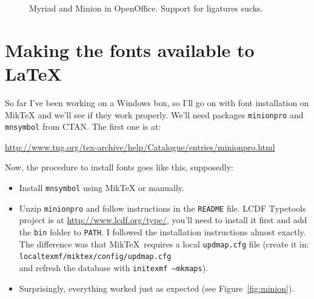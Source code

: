 \documentclass[10pt]{article}
\begin{document}
\begin{figure}[p]
\centering%
\caption{Myriad and Minion in OpenOffice. Support for ligatures sucks.}\label{fig:openoffice}
\end{figure}

\section{Making the fonts available to \LaTeX}

So far I've been working on a Windows box, so I'll go on with font installation on Mik\TeX{} and
we'll see if they work properly. We'll need packages \texttt{minionpro} and \texttt{mnsymbol} 
from CTAN. The first one is at:
\begin{center}\small
\url{http://www.tug.org/tex-archive/help/Catalogue/entries/minionpro.html}
\end{center}

Now, the procedure to install fonts goes like this, supposedly:
\begin{itemize}
    \item Install \texttt{mnsymbol} using Mik\TeX{} or manually.
    \item Unzip \texttt{minionpro} and follow instructions in the \texttt{README}
    file. LCDF Typetools project is at \url{http://www.lcdf.org/type/}, you'll need
    to install it first and add the \texttt{bin} folder to \texttt{PATH}. I followed
    the installation instructions almost exactly. The difference was that Mik\TeX\ requires
    a local \texttt{updmap.cfg} file (create it in:\\
    \texttt{localtexmf/miktex/config/updmap.cfg} \\
    and refresh the database with \texttt{initexmf --mkmaps}).

    \item Surprisingly, everything worked just as expected (see Figure~\ref{fig:minion}).
\end{itemize}
\end{document}
